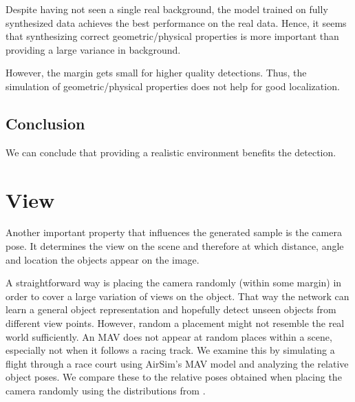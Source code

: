 Despite having not seen a single real background, the model trained on fully synthesized data achieves the best performance on the real data. Hence, it seems that synthesizing correct geometric/physical properties is more important than providing a large variance in background.

However, the margin gets small for higher quality detections. Thus, the simulation of geometric/physical properties does not help for good localization.

\subsection{Conclusion}

We can conclude that providing a realistic environment benefits the detection.

\section{View}

Another important property that influences the generated sample is the camera pose. It determines the view on the scene and therefore at which distance, angle and location the objects appear on the image.

A straightforward way is placing the camera randomly (within some margin) in order to cover a large variation of views on the object. That way the network can learn a general object representation and hopefully detect unseen objects from different view points. However, random a placement might not resemble the real world sufficiently. An \ac{MAV} does not appear at random places within a scene, especially not when it follows a racing track. We examine this by simulating a flight through a race court using AirSim's \ac{MAV} model and analyzing the relative object poses. We compare these to the relative poses obtained when placing the camera randomly using the distributions from .

